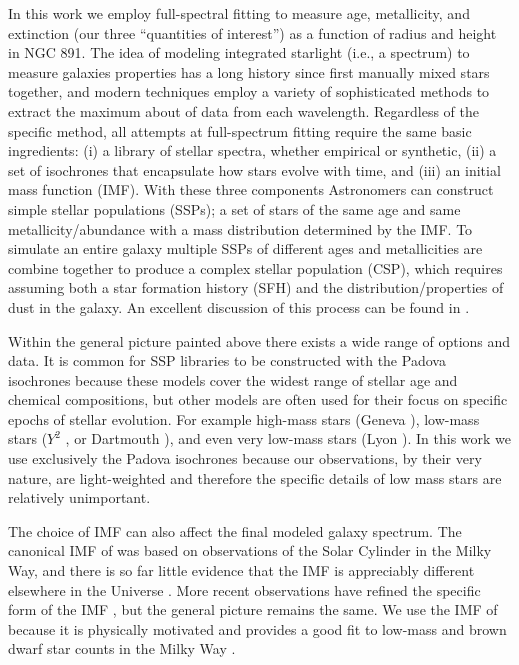 In this work we employ full-spectral fitting to measure age,
metallicity, and extinction (our three ``quantities of interest'') as
a function of radius and height in NGC 891. The idea of modeling
integrated starlight (i.e., a spectrum) to measure galaxies properties
has a long history since \citet{Spinrad71} first manually mixed stars
together, and modern techniques employ a variety of sophisticated
methods to extract the maximum about of data from each
wavelength. Regardless of the specific method, all attempts at
full-spectrum fitting require the same basic ingredients: (i) a
library of stellar spectra, whether empirical or synthetic, (ii) a set
of isochrones that encapsulate how stars evolve with time, and (iii)
an initial mass function (IMF). With these three components
Astronomers can construct simple stellar populations (SSPs); a set of
stars of the same age and same metallicity/abundance with a mass
distribution determined by the IMF. To simulate an entire galaxy
multiple SSPs of different ages and metallicities are combine together
to produce a complex stellar population (CSP), which requires assuming
both a star formation history (SFH) and the distribution/properties of
dust in the galaxy. An excellent discussion of this process can be
found in \citet[and his diagram shown in Figure
\ref{intro:fig:conroy}]{Conroy13}.

Within the general picture painted above there exists a wide range of
options and data. It is common for SSP libraries to be constructed
with the Padova isochrones \citep{Bertelli94, Girardi00, Marigo08}
because these models cover the widest range of stellar age and
chemical compositions, but other models are often used for their focus
on specific epochs of stellar evolution. For example high-mass stars
(Geneva \citep{Schaller92,Meynet00}), low-mass stars ($Y^2$
\citep{Yi01,Yi03}, or Dartmouth \citep{Dotter08}), and even very
low-mass stars (Lyon \citep{Chabrier97,Baraffe98}). In this work we
use exclusively the Padova isochrones because our observations, by
their very nature, are light-weighted and therefore the specific
details of low mass stars are relatively unimportant.

The choice of IMF can also affect the final modeled galaxy
spectrum. The canonical IMF of \citet{Salpeter55} was based on
observations of the Solar Cylinder in the Milky Way, and there is so
far little evidence that the IMF is appreciably different elsewhere in
the Universe \citep{Bastian10}. More recent observations have refined
the specific form of the IMF \citep{Kroupa01, Chabrier03}, but the
general picture remains the same. We use the IMF of \citet{Chabrier03}
because it is physically motivated and provides a good fit to low-mass
and brown dwarf star counts in the Milky Way
\citep{Bruzual03,Chabrier01,Chabrier03}.

